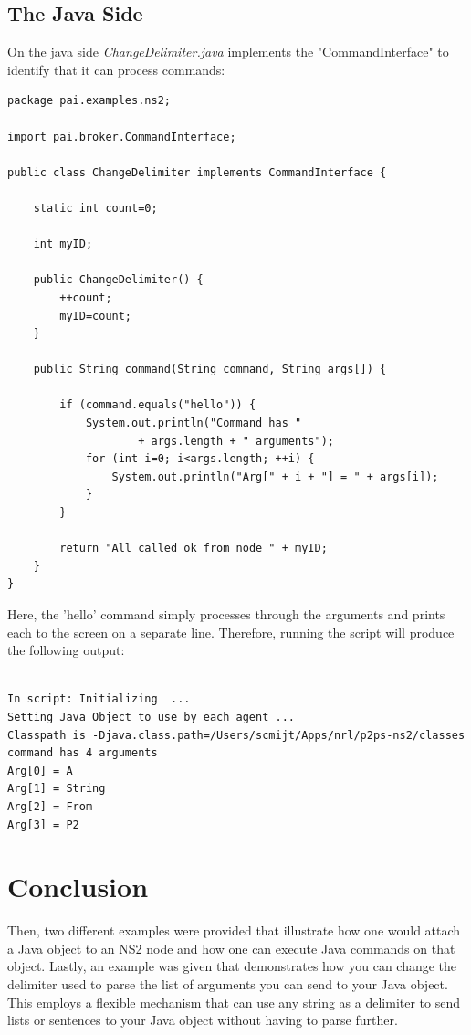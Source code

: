\subsection{The Java Side}
\label{jni:javaside}

On the java side \emph{ChangeDelimiter.java} implements the
"CommandInterface" to identify that it can process commands:

\footnotesize
\begin{verbatim}
package pai.examples.ns2;

import pai.broker.CommandInterface;

public class ChangeDelimiter implements CommandInterface {

    static int count=0;

    int myID;

    public ChangeDelimiter() {
        ++count;
        myID=count;
    }

    public String command(String command, String args[]) {

        if (command.equals("hello")) {
            System.out.println("Command has "
                    + args.length + " arguments");
            for (int i=0; i<args.length; ++i) {
                System.out.println("Arg[" + i + "] = " + args[i]);
            }
        }

        return "All called ok from node " + myID;
    }
}

\end{verbatim}
\normalsize

Here, the 'hello' command simply processes through the arguments and
prints each to the screen on a separate line. Therefore, running the script 
will produce the following output:

\footnotesize
\begin{verbatim}

In script: Initializing  ...
Setting Java Object to use by each agent ...
Classpath is -Djava.class.path=/Users/scmijt/Apps/nrl/p2ps-ns2/classes
command has 4 arguments
Arg[0] = A
Arg[1] = String
Arg[2] = From
Arg[3] = P2

\end{verbatim}
\normalsize

\section{Conclusion}

Then, two different examples were provided that illustrate how one would
attach a Java object to an NS2 node and how one can execute Java
commands on that object.  Lastly, an example was given that demonstrates
how you can change the delimiter used to parse the list of arguments you
can send to your Java object.  This employs a flexible mechanism that 
can use any string as a delimiter to send lists or sentences to your
Java object without having to parse further. 


